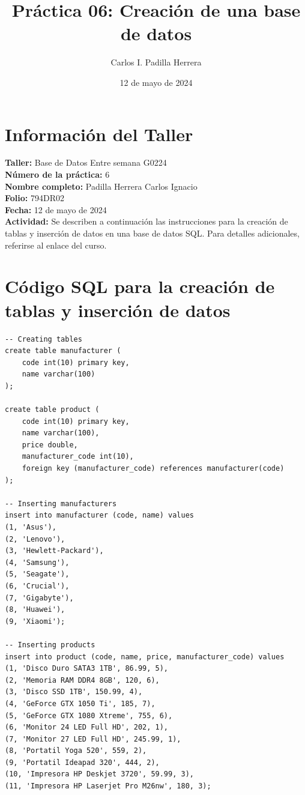 \documentclass{article}
\title{Práctica 06: Creación de una base de datos}
\author{Carlos I. Padilla Herrera}
\date{12 de mayo de 2024}
\begin{document}
\maketitle

\section*{Información del Taller}
\textbf{Taller:} Base de Datos Entre semana G0224 \\
\textbf{Número de la práctica:} 6 \\
\textbf{Nombre completo:} Padilla Herrera Carlos Ignacio \\
\textbf{Folio:} 794DR02 \\
\textbf{Fecha:} 12 de mayo de 2024 \\
\textbf{Actividad:} Se describen a continuación las instrucciones para la creación de tablas y inserción de datos en una base de datos SQL. Para detalles adicionales, referirse al enlace del curso.

\newpage

\section*{Código SQL para la creación de tablas y inserción de datos}

\begin{lstlisting}
-- Creating tables
create table manufacturer (
    code int(10) primary key,
    name varchar(100)
);

create table product (
    code int(10) primary key,
    name varchar(100),
    price double,
    manufacturer_code int(10),
    foreign key (manufacturer_code) references manufacturer(code)
);

-- Inserting manufacturers
insert into manufacturer (code, name) values
(1, 'Asus'),
(2, 'Lenovo'),
(3, 'Hewlett-Packard'),
(4, 'Samsung'),
(5, 'Seagate'),
(6, 'Crucial'),
(7, 'Gigabyte'),
(8, 'Huawei'),
(9, 'Xiaomi');

-- Inserting products
insert into product (code, name, price, manufacturer_code) values
(1, 'Disco Duro SATA3 1TB', 86.99, 5),
(2, 'Memoria RAM DDR4 8GB', 120, 6),
(3, 'Disco SSD 1TB', 150.99, 4),
(4, 'GeForce GTX 1050 Ti', 185, 7),
(5, 'GeForce GTX 1080 Xtreme', 755, 6),
(6, 'Monitor 24 LED Full HD', 202, 1),
(7, 'Monitor 27 LED Full HD', 245.99, 1),
(8, 'Portatil Yoga 520', 559, 2),
(9, 'Portatil Ideapad 320', 444, 2),
(10, 'Impresora HP Deskjet 3720', 59.99, 3),
(11, 'Impresora HP Laserjet Pro M26nw', 180, 3);
\end{lstlisting}
\end{document}
